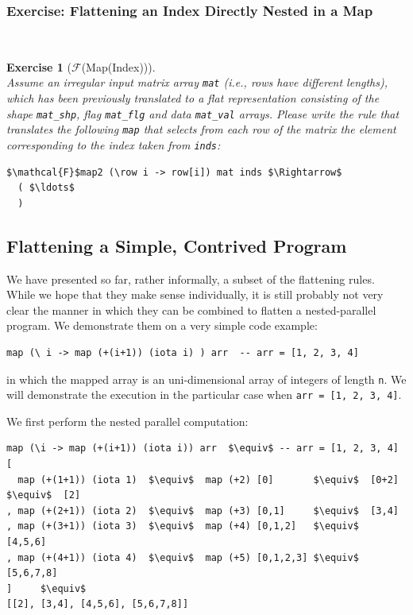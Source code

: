 \documentclass[acmsmall,review]{acmart}\settopmatter{printfolios=true,printccs=false,printacmref=false}
\newtheorem{myexerc}{Exercise}
\begin{document}
\subsubsection{Exercise: Flattening an Index Directly Nested in a Map}
\label{subsubsec:ind-in-map}
$\mbox{ }$\\

\begin{myexerc}[$\mathcal{F}$(Map(Index))]\label{Flat-Ind-In-Map}
$\mbox{ }$\\
Assume an irregular input matrix array {\tt mat} (i.e., rows have
different lengths), which has been previously translated to 
a flat representation consisting of the shape {\tt mat\_shp}, 
flag {\tt mat\_flg} and data {\tt mat\_val} arrays.
Please write the rule that translates the following \lstinline{map} 
that selects from each row of the matrix the element corresponding
to the index taken from {\tt inds}:
\begin{lstlisting}[mathescape=true]
$\mathcal{F}$map2 (\row i -> row[i]) mat inds $\Rightarrow$
  ( $\ldots$
  )
\end{lstlisting}\vspace{-2ex}
\end{myexerc}

\subsection{Flattening a Simple, Contrived Program}
\label{subsec:flatten-simple-eg}

We have presented so far, rather informally, a subset of
the flattening rules. While we hope that they make sense
individually, it is still probably not very clear the manner
in which they can be combined to flatten a nested-parallel
program. We demonstrate them on a very simple code example:
\begin{lstlisting}[mathescape=true]
map (\ i -> map (+(i+1)) (iota i) ) arr  -- arr = [1, 2, 3, 4]
\end{lstlisting}\vspace{-2ex}
in which the mapped array is an uni-dimensional array of integers
of length {\tt n}. We will demonstrate the execution in the
particular case when {\tt arr = [1, 2, 3, 4]}.

We first perform the nested parallel computation:
\begin{lstlisting}[mathescape=true]
map (\i -> map (+(i+1)) (iota i)) arr  $\equiv$ -- arr = [1, 2, 3, 4]
[ 
  map (+(1+1)) (iota 1)  $\equiv$  map (+2) [0]       $\equiv$  [0+2]  $\equiv$  [2]
, map (+(2+1)) (iota 2)  $\equiv$  map (+3) [0,1]     $\equiv$  [3,4]  
, map (+(3+1)) (iota 3)  $\equiv$  map (+4) [0,1,2]   $\equiv$  [4,5,6]
, map (+(4+1)) (iota 4)  $\equiv$  map (+5) [0,1,2,3] $\equiv$  [5,6,7,8]
]     $\equiv$
[[2], [3,4], [4,5,6], [5,6,7,8]]
\end{lstlisting}\vspace{-2ex}
\end{document}
